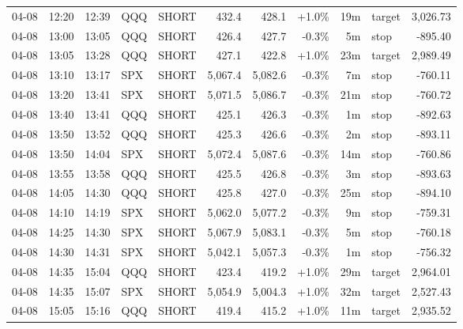 \documentclass[11pt,a4paper,twoside]{article}
\begin{document}
\begin{center}
\begin{longtable}{>{\color{txtmain}}l l l l l r r r r >{\color{txtmain}}l r}
04-08 & 12:20 & 12:39 & QQQ & SHORT & 432.4 & 428.1 & \textcolor{wingreen}{+1.0\%} & 19m & target & \textcolor{wingreen}{3,026.73} \\
04-08 & 13:00 & 13:05 & QQQ & SHORT & 426.4 & 427.7 & \textcolor{lossred}{-0.3\%} & 5m & stop & \textcolor{lossred}{-895.40} \\
04-08 & 13:05 & 13:28 & QQQ & SHORT & 427.1 & 422.8 & \textcolor{wingreen}{+1.0\%} & 23m & target & \textcolor{wingreen}{2,989.49} \\
04-08 & 13:10 & 13:17 & SPX & SHORT & 5,067.4 & 5,082.6 & \textcolor{lossred}{-0.3\%} & 7m & stop & \textcolor{lossred}{-760.11} \\
04-08 & 13:20 & 13:41 & SPX & SHORT & 5,071.5 & 5,086.7 & \textcolor{lossred}{-0.3\%} & 21m & stop & \textcolor{lossred}{-760.72} \\
04-08 & 13:40 & 13:41 & QQQ & SHORT & 425.1 & 426.3 & \textcolor{lossred}{-0.3\%} & 1m & stop & \textcolor{lossred}{-892.63} \\
04-08 & 13:50 & 13:52 & QQQ & SHORT & 425.3 & 426.6 & \textcolor{lossred}{-0.3\%} & 2m & stop & \textcolor{lossred}{-893.11} \\
04-08 & 13:50 & 14:04 & SPX & SHORT & 5,072.4 & 5,087.6 & \textcolor{lossred}{-0.3\%} & 14m & stop & \textcolor{lossred}{-760.86} \\
04-08 & 13:55 & 13:58 & QQQ & SHORT & 425.5 & 426.8 & \textcolor{lossred}{-0.3\%} & 3m & stop & \textcolor{lossred}{-893.63} \\
04-08 & 14:05 & 14:30 & QQQ & SHORT & 425.8 & 427.0 & \textcolor{lossred}{-0.3\%} & 25m & stop & \textcolor{lossred}{-894.10} \\
04-08 & 14:10 & 14:19 & SPX & SHORT & 5,062.0 & 5,077.2 & \textcolor{lossred}{-0.3\%} & 9m & stop & \textcolor{lossred}{-759.31} \\
04-08 & 14:25 & 14:30 & SPX & SHORT & 5,067.9 & 5,083.1 & \textcolor{lossred}{-0.3\%} & 5m & stop & \textcolor{lossred}{-760.18} \\
04-08 & 14:30 & 14:31 & SPX & SHORT & 5,042.1 & 5,057.3 & \textcolor{lossred}{-0.3\%} & 1m & stop & \textcolor{lossred}{-756.32} \\
04-08 & 14:35 & 15:04 & QQQ & SHORT & 423.4 & 419.2 & \textcolor{wingreen}{+1.0\%} & 29m & target & \textcolor{wingreen}{2,964.01} \\
04-08 & 14:35 & 15:07 & SPX & SHORT & 5,054.9 & 5,004.3 & \textcolor{wingreen}{+1.0\%} & 32m & target & \textcolor{wingreen}{2,527.43} \\
04-08 & 15:05 & 15:16 & QQQ & SHORT & 419.4 & 415.2 & \textcolor{wingreen}{+1.0\%} & 11m & target & \textcolor{wingreen}{2,935.52} \\

\end{longtable}
\end{center}
\end{document}
